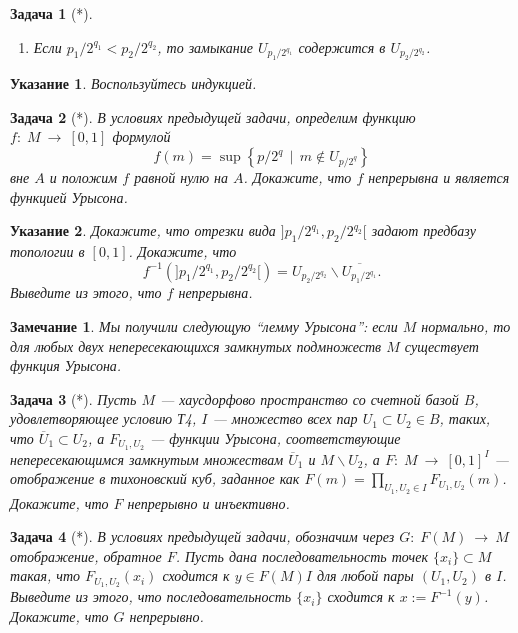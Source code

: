 \documentclass[12pt]{book}
\newcommand{\arrow}{{\:\longrightarrow\:}}
\theoremstyle{upshape}
\newtheorem{zadacha}{Задача}[chapter]
\theoremstyle{generic}
\theoremstyle{upshapenonumber}
\newtheorem{ukazanie}{Указание}[section]
\newtheorem{zamechanie}{Замечание}[chapter]
\newcommand{\следствие}{%
     \refstepcounter{teorema}
     {\noindent\bf Следствие \thechapter.\arabic{teorema}:\ }}
\newcommand{\пример}{%
     \refstepcounter{teorema}
     {\noindent\bf Пример \thechapter.\arabic{teorema}:\ }}
\newcommand{\лемма}{%
     \refstepcounter{teorema}
     {\noindent\bf Лемма \thechapter.\arabic{teorema}:\ }}
\newcommand{\теорема}{%
     \refstepcounter{teorema}
     {\noindent\bf Теорема \thechapter.\arabic{teorema}:\ }}
\newcommand{\утверждение}{%
     \refstepcounter{teorema}
     {\noindent\bf Утверждение \thechapter.\arabic{teorema}:\ }}
\begin{document}
{\begin{zadacha}[*]
\begin{enumerate}
\item Если $p_1/2^{q_1}< p_2/2^{q_2}$, то замыкание $U_{p_1/2^{q_1}}$
содержится в $U_{p_2/2^{q_2}}$.
\end{enumerate}
\end{zadacha}

\begin{ukazanie}
Воспользуйтесь индукцией.
\end{ukazanie}

\begin{zadacha}[*]
В условиях предыдущей задачи, определим функцию $f:\; M \arrow
[0,1]$ формулой
\[  
f(m) = \sup \left\{ p/2^{q} \ \ | \ \ m\notin U_{p/2^q}\right\}
\]
вне $A$ и положим $f$ равной нулю на $A$.
Докажите, что $f$ непрерывна и является функцией Урысона.
\end{zadacha}

\begin{ukazanie} 
Докажите, что отрезки вида $]p_1/2^{q_1}, p_2/2^{q_2}[$ задают предбазу
топологии в $[0,1]$. Докажите, что
\[ 
   f^{-1}(]p_1/2^{q_1}, p_2/2^{q_2}[) =
   U_{p_2/2^{q_2}}\backslash \overline{U_{p_1/2^{q_1}}}.
\]
Выведите из этого, что $f$ непрерывна.
\end{ukazanie}

\begin{zamechanie}
Мы получили следующую ``лемму Урысона'': если $M$ нормально,
то для любых двух непересекающихся замкнутых подмножеств
$M$ существует функция Урысона.
\end{zamechanie}

\begin{zadacha}[*]
Пусть $M$ --- хаусдорфово пространство со счетной базой $B$,
удовлетворяющее условию Т4, $I$ --- множество всех пар $U_1\subset U_2 \in
B$, таких, что $\overline U_1 \subset U_2$, а $F_{U_1,
U_2}$ --- функции Урысона, соответствующие непересекающимся
замкнутым множествам $\overline U_1$ и $M \backslash U_2$, 
а $F:\; M \arrow [0,1]^I$ --- отображение в тихоновский 
куб, заданное как $F(m) = \prod_{U_1, U_2 \in I} F_{U_1,U_2}(m)$.  
Докажите, что $F$ непрерывно и инъективно.
\end{zadacha}

\begin{zadacha}[*]
В условиях предыдущей задачи, обозначим через $G:\; F(M) \arrow M$
отображение, обратное $F$. Пусть дана последовательность точек
$\{x_i\}\subset M$ такая, что $F_{U_1, U_2}(x_i)$ сходится 
к $y\in F(M)I$ для любой пары
$(U_1, U_2)$ в $I$. Выведите из этого, что 
последовательность $\{x_i\}$ сходится к $x:=F^{-1}(y)$. 
Докажите, что $G$ непрерывно.
\end{zadacha}

}
\end{document}
